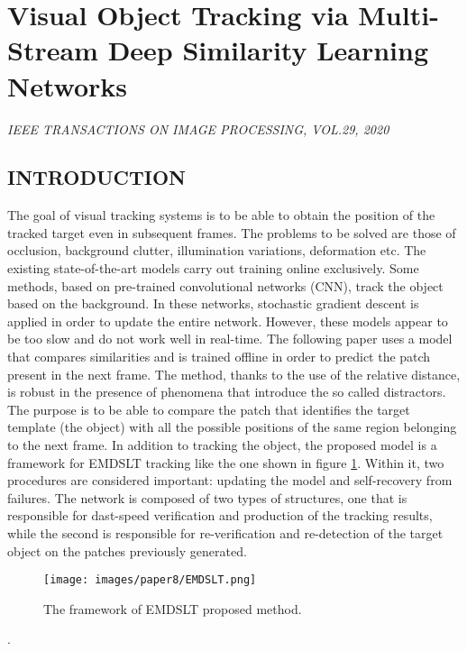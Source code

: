 \section{Visual Object Tracking via Multi-Stream Deep Similarity Learning Networks}

\begin{center}
    \author{
    Kunpeng Li,
    \emph{Student Member, IEEE},
    Yu Kong,
    \emph{Member, IEEE},
    Yunf Fu,
    \emph{Fellow, IEEE}
    }
\end{center}

\begin{center}
    \emph{IEEE TRANSACTIONS ON IMAGE PROCESSING, VOL.29, 2020}
\end{center}

\subsection{INTRODUCTION}
The goal of visual tracking systems is to be able to obtain the position of 
the tracked target even in subsequent frames. The problems to be solved are 
those of occlusion, background clutter, illumination variations, deformation 
etc. The existing state-of-the-art models carry out training online exclusively. 
Some methods, based on pre-trained convolutional networks (CNN), track 
the object based on the background. In these networks, stochastic gradient 
descent is applied in order to update the entire network. However, these 
models appear to be too slow and do not work well in real-time. The following 
paper uses a model that compares similarities and is trained offline in order to 
predict the patch present in the next frame. The method, thanks to the use of 
the relative distance, is robust in the presence of phenomena that introduce 
the so called distractors. The purpose is to be able to compare the patch that 
identifies the target template (the object) with all the possible positions 
of the same region belonging to the next frame. In addition to tracking the 
object, the proposed model is a framework for EMDSLT tracking like the 
one shown in figure \ref{fig:EMDSLT}. Within it, two procedures are considered important: 
updating the model and self-recovery from failures. The network is composed 
of two types of structures, one that is responsible for dast-speed verification 
and production of the tracking results, while the second is responsible for re-verification 
and re-detection of the target object on the patches previously 
generated.
\begin{figure}[h!]
    \centering
    \texttt{[image: images/paper8/EMDSLT.png]}
    \centering
    \caption{The framework of EMDSLT proposed method.}
    \label{fig:EMDSLT}
\end{figure}.

